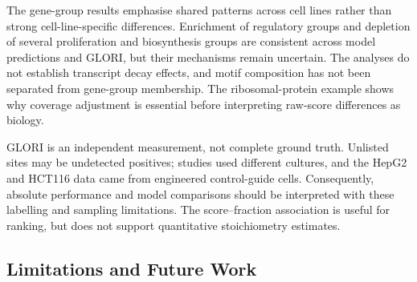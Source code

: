 \documentclass[11pt,a4paper]{article}
\begin{document}
The gene-group results emphasise shared patterns across cell lines rather
than strong cell-line-specific differences. Enrichment of regulatory groups
and depletion of several proliferation and biosynthesis groups are
consistent across model predictions and GLORI, but their mechanisms remain
uncertain. The analyses do not establish transcript decay effects, and
motif composition has not been separated from gene-group membership.
The ribosomal-protein example shows why coverage adjustment is essential
before interpreting raw-score differences as biology.

GLORI is an independent measurement, not complete ground truth. Unlisted
sites may be undetected positives; studies used different cultures, and the
HepG2 and HCT116 data came from engineered control-guide cells. Consequently,
absolute performance and model comparisons should be interpreted with these
labelling and sampling limitations. The score--fraction association is useful
for ranking, but does not support quantitative stoichiometry estimates.

\subsection{Limitations and Future Work}
\label{sec:limits}
\end{document}
